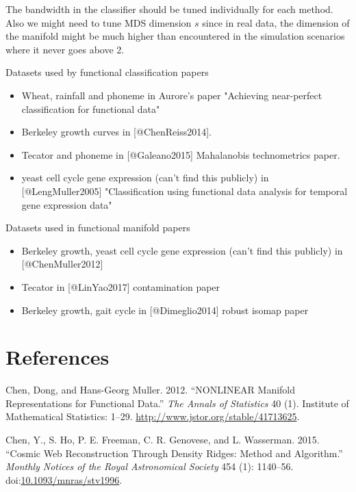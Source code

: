 The bandwidth in the classifier should be tuned individually for each
method. Also we might need to tune MDS dimension \(s\) since in real
data, the dimension of the manifold might be much higher than
encountered in the simulation scenarios where it never goes above 2.

Datasets used by functional classification papers

\begin{itemize}
\item Wheat, rainfall and phoneme in Aurore's paper "Achieving near-perfect classification for functional data"
\item Berkeley growth curves in [@ChenReiss2014].
\item Tecator and phoneme in [@Galeano2015] Mahalanobis technometrics paper.
\item yeast cell cycle gene expression (can't find this publicly) in [@LengMuller2005] "Classification using functional data analysis for temporal gene expression data"
\end{itemize}

Datasets used in functional manifold papers

\begin{itemize}
\item Berkeley growth, yeast cell cycle gene expression (can't find this publicly) in [@ChenMuller2012]
\item Tecator in [@LinYao2017] contamination paper
\item Berkeley growth, gait cycle in [@Dimeglio2014] robust isomap paper
\end{itemize}

\section*{References}\label{references}

\hypertarget{refs}{}
\hypertarget{ref-ChenMuller2012}{}
Chen, Dong, and Hans-Georg Muller. 2012. ``NONLINEAR Manifold
Representations for Functional Data.'' \emph{The Annals of Statistics}
40 (1). Institute of Mathematical Statistics: 1--29.
\url{http://www.jstor.org/stable/41713625}.

\hypertarget{ref-ChenHo2015}{}
Chen, Y., S. Ho, P. E. Freeman, C. R. Genovese, and L. Wasserman. 2015.
``Cosmic Web Reconstruction Through Density Ridges: Method and
Algorithm.'' \emph{Monthly Notices of the Royal Astronomical Society}
454 (1): 1140--56.
doi:\href{https://doi.org/10.1093/mnras/stv1996}{10.1093/mnras/stv1996}.


